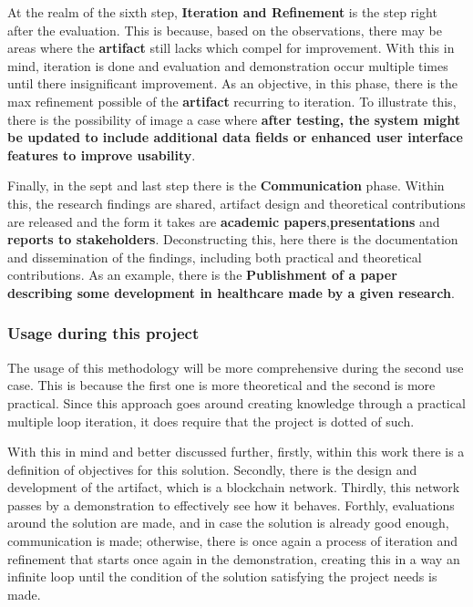  At the realm of the sixth step, \textbf{Iteration and Refinement} is the step right after the evaluation. This is because, based on the observations, there may be areas where the \textbf{artifact} still lacks which compel for improvement. With this in mind, iteration is done and evaluation and demonstration occur multiple times until there insignificant improvement. As an objective, in this phase, there is the max refinement possible of the \textbf{artifact} recurring to iteration. To illustrate this, there is the possibility of image a case where \textbf{after testing, the system might be updated to include additional data fields or enhanced user interface features to improve usability}.

 Finally, in the sept and last step there is the \textbf{Communication} phase. Within this, the research findings are shared, artifact design and theoretical contributions are released and the form it takes are \textbf{academic papers},\textbf{presentations} and \textbf{reports to stakeholders}. Deconstructing this, here there is the documentation and dissemination of the findings, including both practical and theoretical contributions. As an example, there is the \textbf{Publishment of a paper describing some development in healthcare made by a given research}.

\subsubsection{Usage during this project}

The usage of this methodology will be more comprehensive during the second use case. This is because the first one is more theoretical and the second is more practical. Since this approach goes around creating knowledge through a practical multiple loop iteration, it does require that the project is dotted of such.

With this in mind and better discussed further, firstly, within this work there is a definition of objectives for this solution. Secondly, there is the design and development of the artifact, which is a blockchain network. Thirdly, this network passes by a demonstration to effectively see how it behaves. Forthly, evaluations around the solution are made, and in case the solution is already good enough, communication is made; otherwise, there is once again a process of iteration and refinement that starts once again in the demonstration, creating this in a way an infinite loop until the condition of the solution satisfying the project needs is made.

